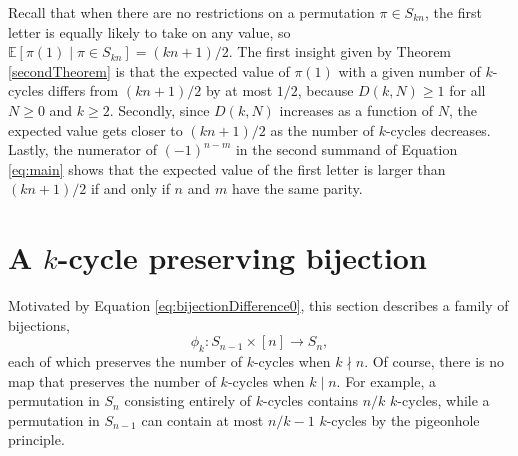 Recall that when there are no restrictions on a permutation $\pi \in S_{kn}$, the
first letter is equally likely to take on any value,
so $\mathbb{E}[\pi(1) \mid \pi \in S_{kn}] = (kn+1)/2$.
The first insight given by Theorem \ref{secondTheorem}
is that the expected value of $\pi(1)$ with a given
number of $k$-cycles differs from $(kn+1)/2$ by at most $1/2$,
because $D(k,N) \geq 1$ for all $N \geq 0$ and $k \geq 2$.
%
Secondly, since $D(k, N)$ increases as a function of $N$, the expected value
gets closer to $(kn+1)/2$ as the number of $k$-cycles decreases.
%
Lastly, the numerator of $(-1)^{n-m}$ in the second summand of
Equation \eqref{eq:main} shows that the expected value of the first letter is
larger than $(kn+1)/2$ if and only if $n$ and $m$ have the same parity.

\section{A \texorpdfstring{$k$}{k}-cycle preserving bijection}
\label{section:bijection}
Motivated by Equation \eqref{eq:bijectionDifference0}, this section describes a
family of bijections,
  \begin{equation}\phi_k \colon S_{n-1} \times [n] \rightarrow S_n,\end{equation}
each of which preserves the number of $k$-cycles when $k \nmid n$.
Of course, there is no map that preserves the number of $k$-cycles when $k \mid n$. For example, a permutation in
$S_n$ consisting entirely of $k$-cycles contains $n/k$ $k$-cycles, while a permutation
in $S_{n-1}$ can contain at most $n/k - 1$ $k$-cycles by the pigeonhole principle.


